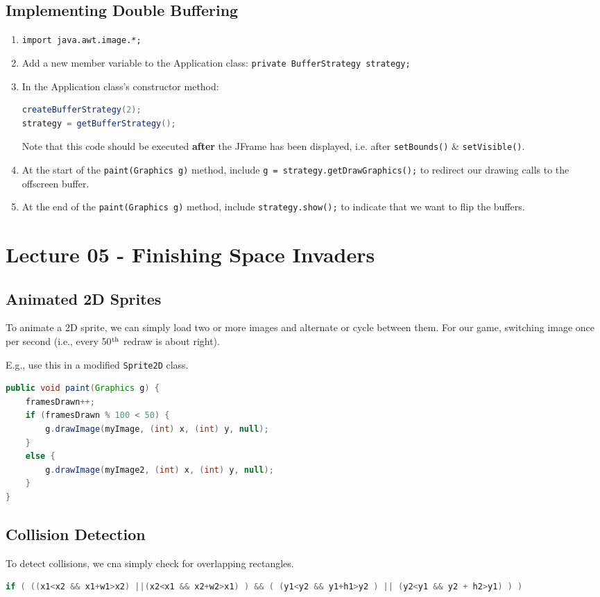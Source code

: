 \documentclass[11pt]{article}
\begin{document}
\subsection{Implementing Double Buffering} 
\begin{enumerate}
    \item   \verb|import java.awt.image.*;| 
    \item   Add a new member variable to the Application class: \verb|private BufferStrategy strategy;| 
    \item   In the Application class's constructor method: 
            \begin{lstlisting}[language=Java] 
createBufferStrategy(2); 
strategy = getBufferStrategy(); \end{lstlisting}
            Note that this code should be executed \textbf{after} the JFrame has been displayed, i.e. after \verb|setBounds()| 
            \& \verb|setVisible()|. 
    \item   At the start of the \verb|paint(Graphics g)| method, include \verb|g = strategy.getDrawGraphics();| to redirect our 
            drawing calls to the offscreen buffer. 
    \item   At the end of the \verb|paint(Graphics g)| method, include \verb|strategy.show();| to indicate that we want to flip 
            the buffers.
\end{enumerate}

\section{Lecture 05 - Finishing Space Invaders} 
\subsection{Animated 2D Sprites}
To animate a 2D sprite, we can simply load two or more images and alternate or cycle between them. 
For our game, switching image once per second (i.e., every 50$\textsuperscript{th}$ redraw is about right). 

E.g., use this in a modified \verb|Sprite2D| class.
\begin{lstlisting}[language=Java]
public void paint(Graphics g) {
    framesDrawn++;
    if (framesDrawn % 100 < 50) {
        g.drawImage(myImage, (int) x, (int) y, null); 
    } 
    else {
        g.drawImage(myImage2, (int) x, (int) y, null); 
    }
}
\end{lstlisting}

\subsection{Collision Detection} 
To detect collisions, we cna simply check for overlapping rectangles.
\begin{lstlisting}[language=Java]
if ( ((x1<x2 && x1+w1>x2) ||(x2<x1 && x2+w2>x1) ) && ( (y1<y2 && y1+h1>y2 ) || (y2<y1 && y2 + h2>y1) ) ) 
\end{lstlisting}
\end{document}
